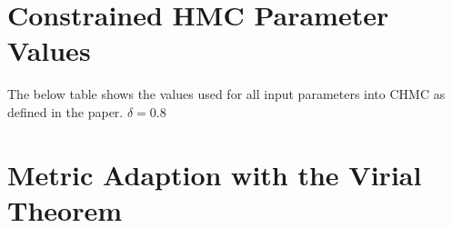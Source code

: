 \documentclass[11pt]{article}
\begin{document}
    \appendix
    \section{Constrained HMC Parameter Values}\label{sec:param_table}
    The below table shows the values used for all input parameters into CHMC as defined in the paper.
    $\delta = 0.8$~\cite{MCMChamiltonian}

    \section{Metric Adaption with the Virial Theorem}\label{sec:metric_derivation}
\end{document}
